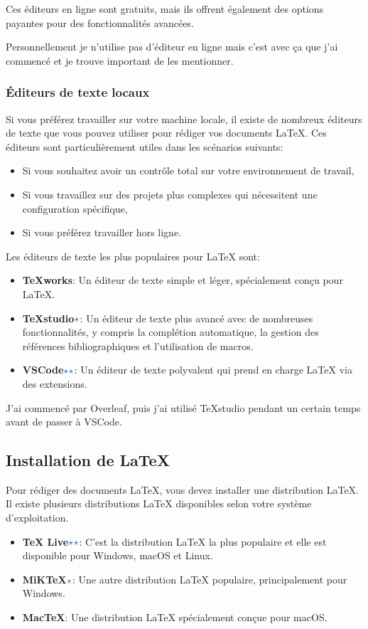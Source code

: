 Ces éditeurs en ligne sont gratuits, mais ils offrent également des options payantes pour des fonctionnalités avancées.

Personnellement je n'utilise pas d'éditeur en ligne mais c'est avec ça que j'ai commencé et je
trouve important de les mentionner.

\subsubsection{Éditeurs de texte locaux}\label{subsubsec:local_editors}
Si vous préférez travailler sur votre machine locale, il existe de nombreux éditeurs de texte que vous pouvez utiliser pour rédiger vos documents LaTeX.
Ces éditeurs sont particulièrement utiles dans les scénarios suivants:

\begin{itemize}
    \item Si vous souhaitez avoir un contrôle total sur votre environnement de travail,
    \item Si vous travaillez sur des projets plus complexes qui nécessitent une configuration spécifique,
    \item Si vous préférez travailler hors ligne.
\end{itemize}

Les éditeurs de texte les plus populaires pour LaTeX sont:

\begin{itemize}
    \item \textbf{TeXworks}: Un éditeur de texte simple et léger, spécialement conçu pour LaTeX.
    \item \textbf{TeXstudio}\(\color{astral}\star\): Un éditeur de texte plus avancé avec de nombreuses fonctionnalités,
    y compris la complétion automatique, la gestion des références bibliographiques et l'utilisation de macros.
    \item \textbf{VSCode}\(\color{astral}\star\star\): Un éditeur de texte polyvalent qui prend en charge LaTeX via des extensions.
\end{itemize}

J'ai commencé par Overleaf, puis j'ai utilisé TeXstudio pendant un certain temps avant de passer à VSCode.

\subsection{Installation de LaTeX}\label{subsec:installation}
Pour rédiger des documents LaTeX, vous devez installer une distribution LaTeX.
Il existe plusieurs distributions LaTeX disponibles selon votre système d'exploitation.
\begin{itemize}
    \item \textbf{TeX Live}\(\color{astral}\star\star\): C'est la distribution LaTeX la plus populaire et elle est disponible pour Windows, macOS et Linux.
    \item \textbf{MiKTeX}\(\color{astral}\star\): Une autre distribution LaTeX populaire, principalement pour Windows.
    \item \textbf{MacTeX}: Une distribution LaTeX spécialement conçue pour macOS.\@
\end{itemize}

